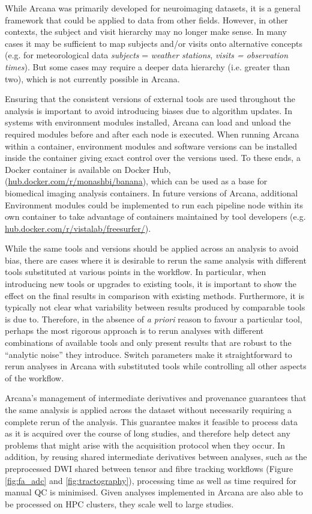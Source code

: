 \documentclass[smallextended]{svjour3}       %
\begin{document}
While Arcana was primarily developed for neuroimaging datasets, it is a
general framework that could be applied to data from other fields.
However, in other contexts, the subject and visit hierarchy may no
longer make sense. In many cases it may be sufficient to map subjects
and/or visits onto alternative concepts (e.g. for meteorological data
\emph{subjects} = \emph{weather stations}, \emph{visits = observation
times}). But some cases may require a deeper data hierarchy (i.e.
greater than two), which is not currently possible in Arcana.

Ensuring that the consistent versions of external tools are used
throughout the analysis is important to avoid introducing biases due to
algorithm updates. In systems with environment modules \citep{furlani_modules:_1991}
installed, Arcana can load and unload the required modules before and
after each node is executed. When running Arcana within a container,
environment modules and software versions can be installed inside the
container giving exact control over the versions used. To these ends, a
Docker container is available on Docker Hub,
(\url{hub.docker.com/r/monashbi/banana}), which can be used as a
base for biomedical imaging analysis containers. In future versions of Arcana,
additional Environment modules could be implemented to run each pipeline
node within its own container to take advantage of
containers maintained by tool developers (e.g. 
\url{hub.docker.com/r/vistalab/freesurfer/}).

While the same tools and versions should be applied across an analysis
to avoid bias, there are cases where it is desirable to rerun the same
analysis with different tools substituted at various points in the
workflow. In particular, when introducing new tools or upgrades to
existing tools, it is important to show the effect on the final results
in comparison with existing methods. Furthermore, it is typically not
clear what variability between results produced by comparable tools is
due to. Therefore, in the absence of \emph{a priori} reason to favour a
particular tool, perhaps the most rigorous approach is to rerun analyses
with different combinations of available tools and only present results
that are robust to the ``analytic noise'' \citep{maumet:inserm-01886089} they introduce.
Switch parameters make it straightforward to rerun analyses in Arcana
with substituted tools while controlling all other aspects of the
workflow.

Arcana's management of intermediate derivatives and provenance
guarantees that the same analysis is applied across the dataset without
necessarily requiring a complete rerun of the analysis. This guarantee
makes it feasible to process data as it is acquired over the course of
long studies, and therefore help detect any problems that might arise
with the acquisition protocol when they occur. In addition, by reusing
shared intermediate derivatives between analyses, such as the
preprocessed DWI shared between tensor and fibre tracking workflows
(Figure \ref{fig:fa_adc} and \ref{fig:tractography}), processing time as
well as time required for manual
QC is minimised. Given analyses implemented in Arcana are also able to
be processed on HPC clusters, they scale well to large studies.
\end{document}
